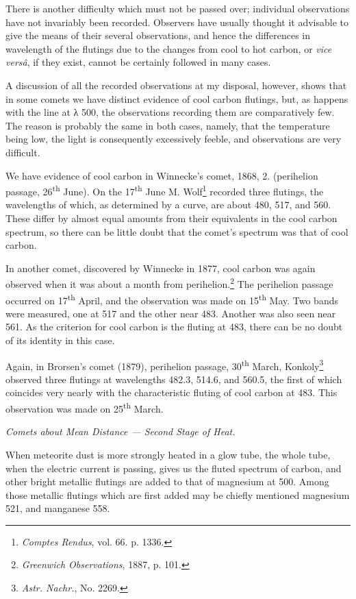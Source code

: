 \documentclass[a4paper, 12pt, oneside, polutonikogreek, english]{article}
\begin{document}
There is another difficulty which must not be passed over; individual observations have not invariably been recorded. Observers have usually thought it advisable to give the means of their several observations, and hence the differences in wavelength of the flutings due to the changes from cool to hot carbon, or \emph{vice versâ}, if they exist, cannot be certainly followed in many cases.

A discussion of all the recorded observations at my disposal, however, shows that in some comets we have distinct evidence of cool carbon flutings, but, as happens with the line at λ 500, the observations recording them are comparatively few. The reason is probably the same in both cases, namely, that the temperature being low, the light is consequently excessively feeble, and observations are very difficult.

We have evidence of cool carbon in Winnecke's comet, 1868, 2. (perihelion passage, 26\textsuperscript{th} June). On the 17\textsuperscript{th} June M. Wolf\footnote{\emph{Comptes Rendus}, vol. 66. p. 1336.} recorded three flutings, the wavelengths of which, as determined by a curve, are about 480, 517, and 560. These differ by almost equal amounts from their equivalents in the cool carbon spectrum, so there can be little doubt that the comet's spectrum was that of cool carbon.

In another comet, discovered by Winnecke in 1877, cool carbon was again observed when it was about a month from perihelion.\footnote{\emph{Greenwich Observations}, 1887, p. 101.} The perihelion passage occurred on 17\textsuperscript{th} April, and the observation was made on 15\textsuperscript{th} May. Two bands were measured, one at 517 and the other near 483. Another was also seen near 561. As the criterion for cool carbon is the fluting at 483, there can be no doubt of its identity in this case.

Again, in Brorsen's comet (1879), perihelion passage, 30\textsuperscript{th} March, Konkoly\footnote{\emph{Astr. Nachr.}, No. 2269.} observed three flutings at wavelengths 482.3, 514.6, and 560.5, the first of which coincides very nearly with the characteristic fluting of cool carbon at 483. This observation was made on 25\textsuperscript{th} March.

\emph{Comets about Mean Distance --- Second Stage of Heat.}

When meteorite dust is more strongly heated in a glow tube, the whole tube, when the electric current is passing, gives us the fluted spectrum of carbon, and other bright metallic flutings are added to that of magnesium at 500. Among those metallic flutings which are first added may be chiefly mentioned magnesium 521, and manganese 558.
\end{document}
